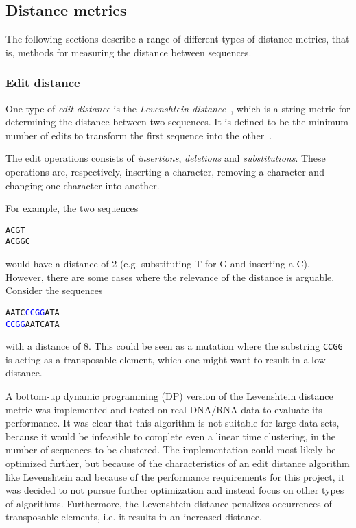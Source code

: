\subsection{Distance metrics}

The following sections describe a range of different types of distance metrics,
that is, methods for measuring the distance between sequences.

\subsubsection{Edit distance}\label{sec:edit_distance}

One type of \emph{edit distance} is the \emph{Levenshtein
distance}~\cite{levenshtein}, which is a string metric for determining the
distance between two sequences. It is defined to be the minimum number of
edits to transform the first sequence into the other~\cite[p.~52]{dong}.

The edit operations consists of \emph{insertions}, \emph{deletions} and
\emph{substitutions}. These operations are, respectively, inserting a character,
removing a character and changing one character into another.

For example, the two sequences
\begin{center}
  \texttt{ACGT} \\
  \texttt{ACGGC}
\end{center}
would have a distance of \num{2} (e.g. substituting T for G and inserting a C).
However, there are some cases where the relevance of the distance is arguable.
Consider the sequences
\begin{center}
  \texttt{AATC\textcolor{blue}{CCGG}ATA} \\
  \texttt{\textcolor{blue}{CCGG}AATCATA}
\end{center}
with a distance of \num{8}. This could be seen as a mutation where the substring
\texttt{CCGG} is acting as a transposable element, which one might want to
result in a low distance.

A bottom-up dynamic programming (DP) version of the Levenshtein distance
metric was implemented and tested on real DNA/RNA data to evaluate its
performance. It was clear that this algorithm is not suitable for large
data sets, because it would be infeasible to complete even a linear time
clustering, in the number of sequences to be clustered. The implementation
could most likely be optimized further, but because of the characteristics of
an edit distance algorithm like Levenshtein and because of the performance
requirements for this project, it was decided to not pursue further
optimization and instead focus on other types of algorithms. Furthermore, the
Levenshtein distance penalizes occurrences of transposable elements, i.e. it
results in an increased distance.

